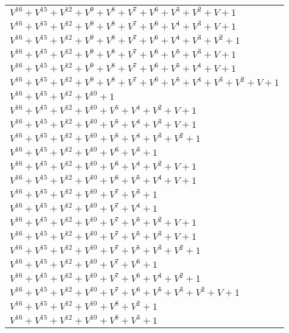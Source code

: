 \documentclass[12pt]{article}
\begin{document}
\begin{adjustwidth}{-4cm}{}
\begin{center}
\begin{longtable}{|l|}
$V^{16}  +V^{15}  +V^{12}  +V^{9}  +V^{8}  +V^{7}  +V^{6}  +V^{3}  +V^{2}  + V + 1$ \\
$V^{16}  +V^{15}  +V^{12}  +V^{9}  +V^{8}  +V^{7}  +V^{6}  +V^{4}  +V^{3}  + V + 1$ \\
$V^{16}  +V^{15}  +V^{12}  +V^{9}  +V^{8}  +V^{7}  +V^{6}  +V^{4}  +V^{3}  +V^{2}  + 1$ \\
$V^{16}  +V^{15}  +V^{12}  +V^{9}  +V^{8}  +V^{7}  +V^{6}  +V^{5}  +V^{3}  + V + 1$ \\
$V^{16}  +V^{15}  +V^{12}  +V^{9}  +V^{8}  +V^{7}  +V^{6}  +V^{5}  +V^{4}  + V + 1$ \\
$V^{16}  +V^{15}  +V^{12}  +V^{9}  +V^{8}  +V^{7}  +V^{6}  +V^{5}  +V^{4}  +V^{3}  +V^{2}  + V + 1$ \\
$V^{16}  +V^{15}  +V^{12}  +V^{10}  + 1$ \\
$V^{16}  +V^{15}  +V^{12}  +V^{10}  +V^{5}  +V^{4}  +V^{2}  + V + 1$ \\
$V^{16}  +V^{15}  +V^{12}  +V^{10}  +V^{5}  +V^{4}  +V^{3}  + V + 1$ \\
$V^{16}  +V^{15}  +V^{12}  +V^{10}  +V^{5}  +V^{4}  +V^{3}  +V^{2}  + 1$ \\
$V^{16}  +V^{15}  +V^{12}  +V^{10}  +V^{6}  +V^{3}  + 1$ \\
$V^{16}  +V^{15}  +V^{12}  +V^{10}  +V^{6}  +V^{4}  +V^{2}  + V + 1$ \\
$V^{16}  +V^{15}  +V^{12}  +V^{10}  +V^{6}  +V^{5}  +V^{4}  + V + 1$ \\
$V^{16}  +V^{15}  +V^{12}  +V^{10}  +V^{7}  +V^{3}  + 1$ \\
$V^{16}  +V^{15}  +V^{12}  +V^{10}  +V^{7}  +V^{4}  + 1$ \\
$V^{16}  +V^{15}  +V^{12}  +V^{10}  +V^{7}  +V^{5}  +V^{2}  + V + 1$ \\
$V^{16}  +V^{15}  +V^{12}  +V^{10}  +V^{7}  +V^{5}  +V^{3}  + V + 1$ \\
$V^{16}  +V^{15}  +V^{12}  +V^{10}  +V^{7}  +V^{5}  +V^{3}  +V^{2}  + 1$ \\
$V^{16}  +V^{15}  +V^{12}  +V^{10}  +V^{7}  +V^{6}  + 1$ \\
$V^{16}  +V^{15}  +V^{12}  +V^{10}  +V^{7}  +V^{6}  +V^{4}  +V^{2}  + 1$ \\
$V^{16}  +V^{15}  +V^{12}  +V^{10}  +V^{7}  +V^{6}  +V^{5}  +V^{3}  +V^{2}  + V + 1$ \\
$V^{16}  +V^{15}  +V^{12}  +V^{10}  +V^{8}  +V^{2}  + 1$ \\
$V^{16}  +V^{15}  +V^{12}  +V^{10}  +V^{8}  +V^{3}  + 1$ \\

\end{longtable}
\end{center}
\end{adjustwidth}
\end{document}

